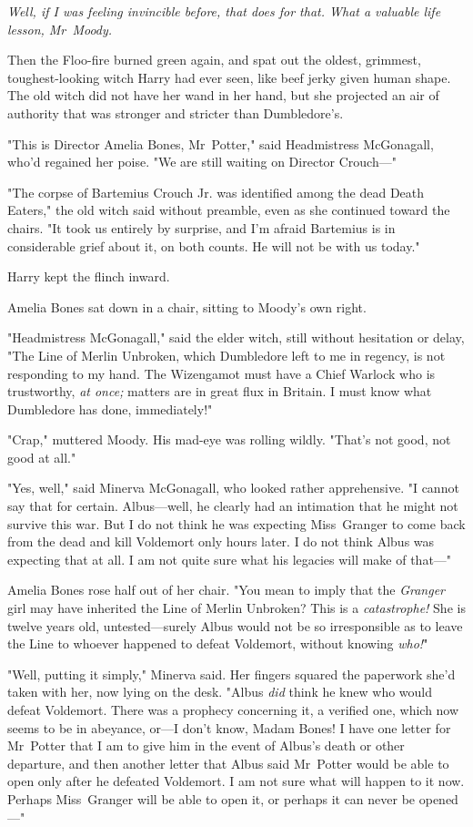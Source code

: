 \emph{Well, if I was feeling invincible before, that does for that. What a
valuable life lesson, Mr~Moody.}

Then the Floo-fire burned green again, and spat out the oldest, grimmest,
toughest-looking witch Harry had ever seen, like beef jerky given human shape.
The old witch did not have her wand in her hand, but she projected an air of
authority that was stronger and stricter than Dumbledore's.

"This is Director Amelia Bones, Mr~Potter," said Headmistress McGonagall,
who'd regained her poise. "We are still waiting on Director Crouch---"

"The corpse of Bartemius Crouch Jr. was identified among the dead Death
Eaters," the old witch said without preamble, even as she continued toward the
chairs. "It took us entirely by surprise, and I'm afraid Bartemius is in
considerable grief about it, on both counts. He will not be with us today."

Harry kept the flinch inward.

Amelia Bones sat down in a chair, sitting to Moody's own right.

"Headmistress McGonagall," said the elder witch, still without hesitation or
delay, "The Line of Merlin Unbroken, which Dumbledore left to me in regency, is
not responding to my hand. The Wizengamot must have a Chief Warlock who is
trustworthy, \emph{at once;} matters are in great flux in Britain. I must know
what Dumbledore has done, immediately!"

"Crap," muttered Moody. His mad-eye was rolling wildly. "That's not good, not
good at all."

"Yes, well," said Minerva McGonagall, who looked rather apprehensive. "I cannot
say that for certain. Albus---well, he clearly had an intimation that he might
not survive this war. But I do not think he was expecting Miss~Granger to come
back from the dead and kill Voldemort only hours later. I do not think Albus
was expecting that at all. I am not quite sure what his legacies will make of
that---"

Amelia Bones rose half out of her chair. "You mean to imply that the
\emph{Granger} girl may have inherited the Line of Merlin Unbroken? This is a
\emph{catastrophe!} She is twelve years old, untested---surely Albus would not
be so irresponsible as to leave the Line to whoever happened to defeat
Voldemort, without knowing \emph{who!}"

"Well, putting it simply," Minerva said. Her fingers squared the paperwork
she'd taken with her, now lying on the desk. "Albus \emph{did} think he knew
who would defeat Voldemort. There was a prophecy concerning it, a verified one,
which now seems to be in abeyance, or---I don't know, Madam Bones! I have one
letter for Mr~Potter that I am to give him in the event of Albus's death or
other departure, and then another letter that Albus said Mr~Potter would be
able to open only after he defeated Voldemort. I am not sure what will happen
to it now. Perhaps Miss~Granger will be able to open it, or perhaps it can
never be opened---"

